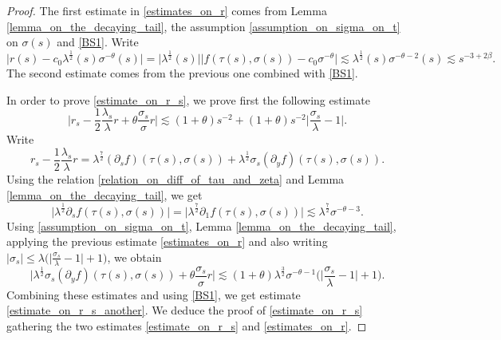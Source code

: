 \documentclass[16pt,english, oneside,reqno]{smfart}
\begin{document}
\begin{proof}
    The first estimate in \eqref{estimates_on_r} comes from Lemma \ref{lemma_on_the_decaying_tail}, the assumption \eqref{assumption_on_sigma_on_t} on $\sigma(s)$ and \eqref{BS1}. Write 
    \begin{equation}
        \lvert r(s)-c_0 \lambda^{\frac 12}(s)\sigma^{-\theta}(s) \rvert = \lvert \lambda^{\frac{1}{2}}(s) \rvert \lvert f(\tau(s),\sigma(s))-c
        _0 \sigma^{-\theta}\rvert \lesssim \lambda^{\frac{1}{2}}(s) \sigma^{-\theta-2}(s) \lesssim s^{-3+2\beta}.
    \end{equation}
    The second estimate comes from the previous one combined with \eqref{BS1}. 

\vspace{0.4cm}
    In order to prove \eqref{estimate_on_r_s}, we prove first the following estimate
    \begin{equation}\label{estimate_on_r_s_another}
        \Big\lvert r_s - \frac{1}{2}\frac{\lambda_s}{\lambda}r + \theta\frac{\sigma_s}{\sigma}r \Big\lvert \lesssim (1+\theta)s^{-2}+(1+\theta)s^{-2}\Big\lvert \frac{\sigma_s}{\lambda}-1 \Big\rvert.
    \end{equation}
    Write 
    \begin{equation}
        r_s - \frac{1}{2}\frac{\lambda_s}{\lambda}r = \lambda^{\frac{7}{2}}(\partial_s f)(\tau(s),\sigma(s))+\lambda^{\frac{1}{2}}\sigma_s (\partial_y f)(\tau(s), \sigma(s)).
    \end{equation}
    Using the relation \eqref{relation_on_diff_of_tau_and_zeta} and  Lemma \ref{lemma_on_the_decaying_tail}, we get
    \begin{equation}
         \lvert \lambda^{\frac{1}{2}}\partial_s f(\tau(s),\sigma(s)) \rvert = \lvert \lambda^{\frac{7}{2}}\partial_1f(\tau(s),\sigma(s)) \rvert \lesssim \lambda^{\frac{7}{2}}\sigma^{-\theta-3}.
    \end{equation}
    Using \eqref{assumption_on_sigma_on_t}, Lemma \ref{lemma_on_the_decaying_tail}, applying the previous estimate \eqref{estimates_on_r} and also writing $|\sigma_s|\leq \lambda\big(\big|\frac{\sigma_s}{\lambda} -1 \big| + 1\big)$, we obtain
    \begin{equation}
        \big\lvert \lambda^{\frac{1}{2}}\sigma_s (\partial_y f)(\tau(s),\sigma(s)) + \theta \frac{\sigma_s}{\sigma}r \big\rvert \lesssim (1+\theta)\lambda^{\frac{3}{2}}\sigma^{-\theta-1}\Big(\Big\lvert \frac{\sigma_s}{\lambda}-1\Big\rvert + 1 \Big).
    \end{equation}
    Combining these estimates and using \eqref{BS1}, we get estimate \eqref{estimate_on_r_s_another}. We deduce the proof of \eqref{estimate_on_r_s} gathering the two estimates \eqref{estimate_on_r_s} and \eqref{estimates_on_r}.
    

\end{proof}
\end{document}
